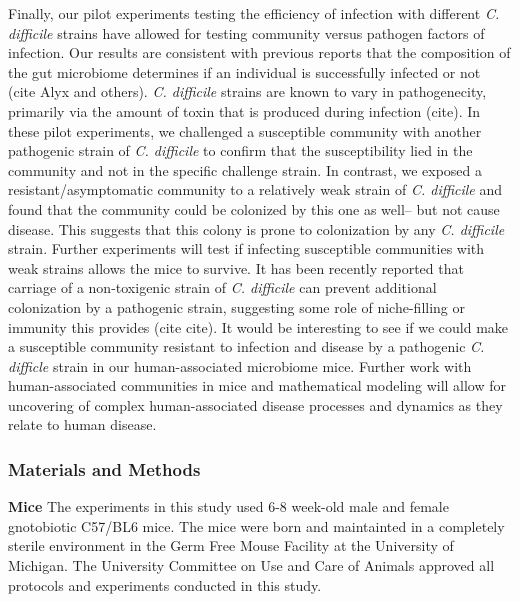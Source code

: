 \documentclass[11pt,]{article}
\begin{document}
Finally, our pilot experiments testing the efficiency of infection with
different \emph{C. difficile} strains have allowed for testing community
versus pathogen factors of infection. Our results are consistent with
previous reports that the composition of the gut microbiome determines
if an individual is successfully infected or not (cite Alyx and others).
\emph{C. difficile} strains are known to vary in pathogenecity,
primarily via the amount of toxin that is produced during infection
(cite). In these pilot experiments, we challenged a susceptible
community with another pathogenic strain of \emph{C. difficile} to
confirm that the susceptibility lied in the community and not in the
specific challenge strain. In contrast, we exposed a
resistant/asymptomatic community to a relatively weak strain of \emph{C.
difficile} and found that the community could be colonized by this one
as well-- but not cause disease. This suggests that this colony is prone
to colonization by any \emph{C. difficile} strain. Further experiments
will test if infecting susceptible communities with weak strains allows
the mice to survive. It has been recently reported that carriage of a
non-toxigenic strain of \emph{C. difficile} can prevent additional
colonization by a pathogenic strain, suggesting some role of
niche-filling or immunity this provides (cite cite). It would be
interesting to see if we could make a susceptible community resistant to
infection and disease by a pathogenic \emph{C. difficle} strain in our
human-associated microbiome mice. Further work with human-associated
communities in mice and mathematical modeling will allow for uncovering
of complex human-associated disease processes and dynamics as they
relate to human disease.

\subsubsection{Materials and Methods}\label{materials-and-methods}

\textbf{Mice} The experiments in this study used 6-8 week-old male and
female gnotobiotic C57/BL6 mice. The mice were born and maintainted in a
completely sterile environment in the Germ Free Mouse Facility at the
University of Michigan. The University Committee on Use and Care of
Animals approved all protocols and experiments conducted in this study.
\end{document}
